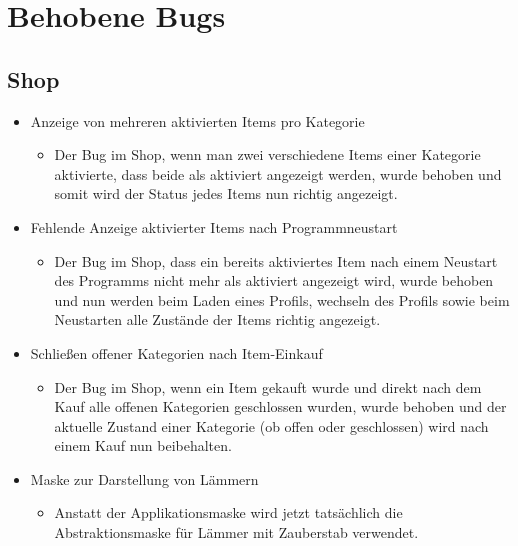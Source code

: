 \section{Behobene Bugs}
\subsection{Shop}
\begin{itemize}
\item Anzeige von mehreren aktivierten Items pro Kategorie
\begin{itemize} 
\item Der Bug im Shop, wenn man zwei verschiedene Items einer Kategorie aktivierte, dass beide als aktiviert angezeigt werden, wurde behoben
	und somit wird der Status jedes Items nun richtig angezeigt.
	\end{itemize}
\end{itemize}

\begin{itemize}
\item Fehlende Anzeige aktivierter Items nach Programmneustart
\begin{itemize} 
\item Der Bug im Shop, dass ein bereits aktiviertes Item nach einem Neustart des Programms nicht mehr als aktiviert angezeigt wird, wurde behoben
	und nun werden beim Laden eines Profils, wechseln des Profils sowie beim Neustarten alle Zustände der Items richtig angezeigt.
	\end{itemize}
\end{itemize}

\begin{itemize}
\item Schließen offener Kategorien nach Item-Einkauf
\begin{itemize} 
\item Der Bug im Shop, wenn ein Item gekauft wurde und direkt nach dem Kauf alle offenen Kategorien geschlossen wurden, wurde behoben und
	der aktuelle Zustand einer Kategorie (ob offen oder geschlossen) wird nach einem Kauf nun beibehalten.
	\end{itemize}
\end{itemize}

\begin{itemize}
\item Maske zur Darstellung von Lämmern
\begin{itemize} 
\item Anstatt der Applikationsmaske wird jetzt tatsächlich die Abstraktionsmaske für Lämmer mit Zauberstab verwendet.
	\end{itemize}
\end{itemize}

